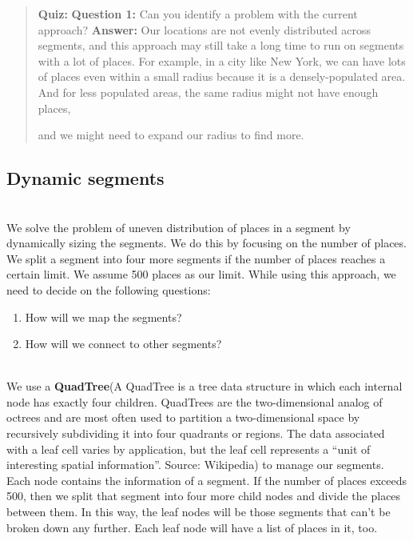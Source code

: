 \begin{quote}
\textbf{Quiz:}
\textbf{Question 1:} Can you identify a problem with the current approach?
\textbf{Answer:} Our locations are not evenly distributed across segments, and this approach may still take a long time to run on segments with a lot of places. For example, in a city like New York, we can have lots of places even within a small radius because it is a densely-populated area. And for less populated areas, the same radius might not have enough places,

and we might need to expand our radius to find more.
\end{quote}

\subsection{Dynamic segments}\label{MAgF8dsxCfaJa_1VJbeNx}
\\
We solve the problem of uneven distribution of places in a segment by dynamically sizing the segments. We do this by focusing on the number of places. We split a segment into four more segments if the number of places reaches a certain limit. We assume 500 places as our limit. While using this approach, we need to decide on the following questions:

\begin{enumerate}
\item
\protect{}\label{W1GFlpFPtn6ey388ZIKFC}
How will we map the segments?
\item
\protect{}\label{DhcDu7Yc9sCzdcKFvlT-d}
How will we connect to other segments?
\end{enumerate}
\\
We use a \textbf{QuadTree}(A QuadTree is a tree data structure in which each internal node has exactly four children. QuadTrees are the two-dimensional analog of octrees and are most often used to partition a two-dimensional space by recursively subdividing it into four quadrants or regions. The data associated with a leaf cell varies by application, but the leaf cell represents a ``unit of interesting spatial information''. Source: Wikipedia) to manage our segments. Each node contains the information of a segment. If the number of places exceeds 500, then we split that segment into four more child nodes and divide the places between them. In this way, the leaf nodes will be those segments that can't be broken down any further. Each leaf node will have a list of places in it, too.

